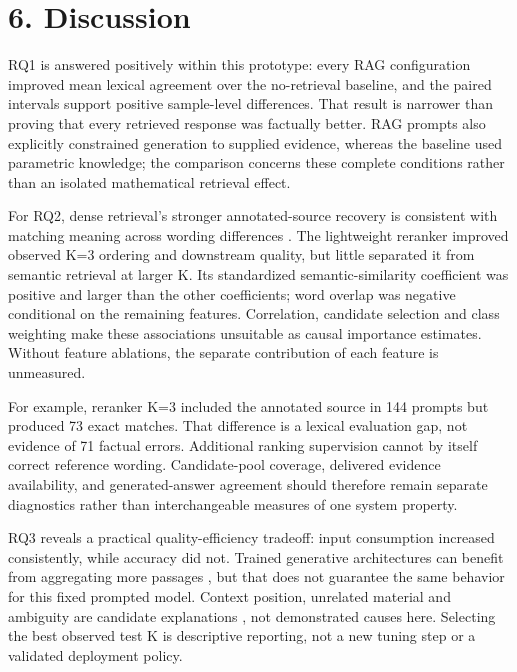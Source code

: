 \documentclass[
  11pt,
]{article}
\begin{document}
\hypertarget{discussion}{%
\section{6. Discussion}\label{discussion}}

RQ1 is answered positively within this prototype: every RAG
configuration improved mean lexical agreement over the no-retrieval
baseline, and the paired intervals support positive sample-level
differences. That result is narrower than proving that every retrieved
response was factually better. RAG prompts also explicitly constrained
generation to supplied evidence, whereas the baseline used parametric
knowledge; the comparison concerns these complete conditions rather than
an isolated mathematical retrieval effect.

For RQ2, dense retrieval's stronger annotated-source recovery is
consistent with matching meaning across wording differences
\citep{dpr, sbert}. The lightweight reranker improved observed K=3
ordering and downstream quality, but little separated it from semantic
retrieval at larger K. Its standardized semantic-similarity coefficient
was positive and larger than the other coefficients; word overlap was
negative conditional on the remaining features. Correlation, candidate
selection and class weighting make these associations unsuitable as
causal importance estimates. Without feature ablations, the separate
contribution of each feature is unmeasured.

For example, reranker K=3 included the annotated source in 144 prompts
but produced 73 exact matches. That difference is a lexical evaluation
gap, not evidence of 71 factual errors. Additional ranking supervision
cannot by itself correct reference wording. Candidate-pool coverage,
delivered evidence availability, and generated-answer agreement should
therefore remain separate diagnostics rather than interchangeable
measures of one system property.

RQ3 reveals a practical quality-efficiency tradeoff: input consumption
increased consistently, while accuracy did not. Trained generative
architectures can benefit from aggregating more passages \citep{fid},
but that does not guarantee the same behavior for this fixed prompted
model. Context position, unrelated material and ambiguity are candidate
explanations \citep{lost_middle, distracted}, not demonstrated causes
here. Selecting the best observed test K is descriptive reporting, not a
new tuning step or a validated deployment policy.
\end{document}
